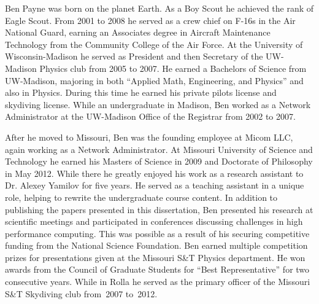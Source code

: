 
Ben Payne was born on the planet Earth. As a Boy Scout he achieved the rank of Eagle Scout. From 2001 to 2008 he served as a crew chief on F-16s in the Air National Guard, earning an Associates degree in Aircraft Maintenance Technology from the Community College of the Air Force. At the University of Wisconsin-Madison he served as President and then Secretary of the UW-Madison Physics club from 2005 to 2007. He earned a Bachelors of Science from UW-Madison, majoring in both ``Applied Math, Engineering, and Physics'' and also in Physics. During this time he earned his private pilots license and skydiving license. While an undergraduate in Madison, Ben worked as a Network Administrator at the UW-Madison Office of the Registrar from 2002 to 2007. 

After he moved to Missouri, Ben was the founding employee at Micom LLC, again working as a Network Administrator. At Missouri University of Science and Technology he earned his Masters of Science in 2009 and Doctorate of Philosophy in May 2012. While there he greatly enjoyed his work as a research assistant to Dr. Alexey Yamilov for five years. He served as a teaching assistant in a unique role, helping to rewrite the undergraduate course content. In addition to publishing the papers presented in this dissertation, Ben presented his research at scientific meetings and participated in conferences discussing challenges in high performance computing. This was possible as a result of his securing competitive funding from the National Science Foundation. Ben earned multiple competition prizes for presentations given at the Missouri S\&T Physics department. He won awards from the Council of Graduate Students for ``Best Representative'' for two consecutive years. While in Rolla he served as the primary officer of the Missouri S\&T Skydiving club from~2007 to~2012. 

